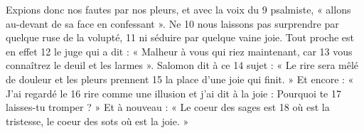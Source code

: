 Expions donc nos fautes par nos pleurs, et avec la voix du	 
9	 	psalmiste, « allons au-devant de sa face en confessant ». Ne	 
10	 	nous laissons pas surprendre par quelque ruse de la volupté,	 
11	 	ni séduire par quelque vaine joie. Tout proche est en effet	 
12	 	le juge qui a dit : « Malheur à vous qui riez maintenant, car	 
13	 	vous connaîtrez le deuil et les larmes ». Salomon dit à ce	 
14	 	sujet : « Le rire sera mêlé de douleur et les pleurs prennent	 
15	 	la place d'une joie qui finit. » Et encore : « J'ai regardé le	 
16	 	rire comme une illusion et j'ai dit à la joie : Pourquoi te	 
17	 	laisses-tu tromper ? » Et à nouveau : « Le coeur des sages est	 
18	 	où est la tristesse, le coeur des sots où est la joie. »